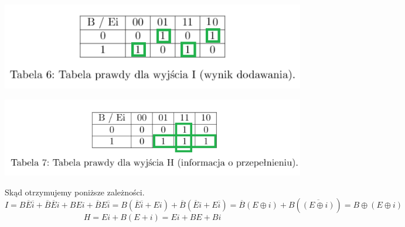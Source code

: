 \documentclass{article}
\begin{document}
            \begin{center}
                \includegraphics[widht=18cm]{reports/img/Z1A_tab_1.png}\\
            \end{center}
            \begin{center}
                \includegraphics[widht=18cm]{reports/img/Z1A_tab_2.png}\\
            \end{center}
            Skąd otrzymujemy poniższe zależności. 
            $$I = B\overline{E}\overline{i} + \overline{B}\overline{E}i + BEi + \overline{B}E\overline{i} = B(\overline{E}\overline{i} + Ei) + \overline{B}(\overline{E}i + E\overline{i}) = \overline{B}(E\oplus i) + B(\overline{(E\oplus i)}) = B\oplus(E\oplus i)$$
            $$H = Ei + B(E + i) = Ei + BE + Bi$$
\end{document}
